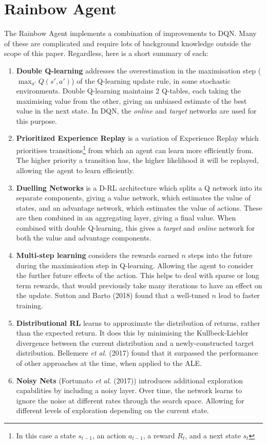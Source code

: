 \section{Rainbow Agent}
The Rainbow Agent implements a combination of improvements to DQN. Many of these are complicated and require lots of background knowledge outside the scope of this paper. Regardless, here is a short summary of each:
\begin{enumerate}
    \item \textbf{Double Q-learning}\cite{van2016doubleq} addresses the overestimation in the maximisation step ($\max_{a'} Q(s', a')$) of the Q-learning update rule, in some stochastic environments. Double Q-learning maintains 2 Q-tables, each taking the maximising value from the other, giving an unbiased estimate of the best value in the next state. In DQN, the \textit{online} and \textit{target} networks are used for this purpose.
    \item \textbf{Prioritized Experience Replay}\cite{schaul2015prioritized} is a variation of Experience Replay\cite{lin1992self} which prioritises transitions\footnote{In this case a state $s_{t-1}$, an action $a_{t-1}$, a reward $R_{t}$, and a next state $s_t$} from which an agent can learn more efficiently from. The higher priority a transition has, the higher likelihood it will be replayed, allowing the agent to learn efficiently.
    \item \textbf{Duelling Networks} \cite{wang2016dueling} is a D-RL architecture which splits a Q network into its separate components, giving a value network, which estimates the value of states, and an advantage network, which estimates the value of actions. These are then combined in an aggregating layer, giving a final value. When combined with double Q-learning, this gives a \textit{target} and \textit{online} network for both the value and advantage components.
    \item \textbf{Multi-step learning} considers the rewards earned $n$ steps into the future during the maximisation step in Q-learning. Allowing the agent to consider the further future effects of the action. This helps to deal with sparse or long term rewards, that would previously take many iterations to have an effect on the update. Sutton and Barto (2018) \cite{sutton2018reinforcement} found that a well-tuned $n$ lead to faster training.
    \item \textbf{Distributional RL} learns to approximate the distribution of returns, rather than the expected return. It does this by minimising the Kullbeck-Liebler divergence between the current distribution and a newly-constructed target distribution. Bellemere \textit{et al.} (2017)\cite{bellemare2017distributional} found that it surpassed the performance of other approaches at the time, when applied to the ALE.
    \item \textbf{Noisy Nets} (Fortunato \textit{et al.} (2017)) \cite{DBLP:journals/corr/FortunatoAPMOGM17} introduces additional exploration capabilities by including a noisy layer. Over time, the network learns to ignore the noise at different rates through the search space. Allowing for different levels of exploration depending on the current state. 
\end{enumerate}
